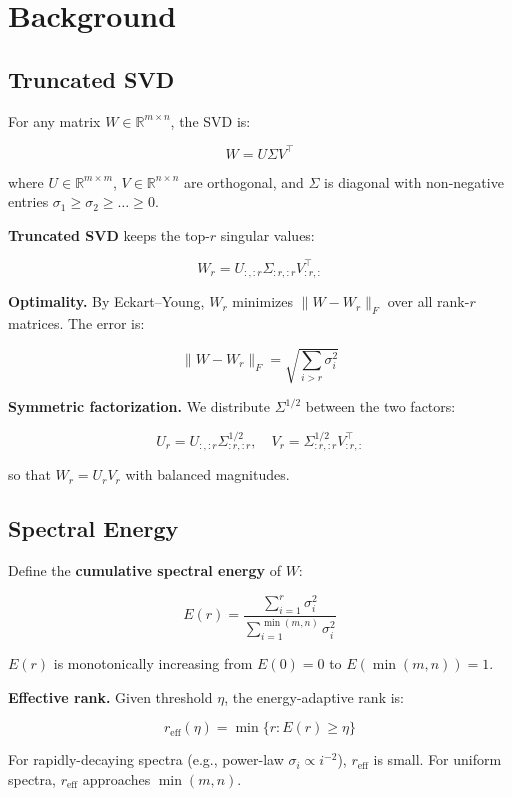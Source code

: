 
\section{Background}

\subsection{Truncated SVD}

For any matrix $W \in \mathbb{R}^{m \times n}$, the SVD is:

\[
W = U \Sigma V^\top
\tag{3.1}
\]

where $U \in \mathbb{R}^{m \times m}$, $V \in \mathbb{R}^{n \times n}$ are 
orthogonal, and $\Sigma$ is diagonal with non-negative entries 
$\sigma_1 \geq \sigma_2 \geq \dots \geq 0$.

\textbf{Truncated SVD} keeps the top-$r$ singular values:

\[
W_r = U_{:, :r} \Sigma_{:r, :r} V_{:r, :}^\top
\tag{3.2}
\]

\textbf{Optimality.} By Eckart--Young, $W_r$ minimizes $\|W - W_r\|_F$ over all 
rank-$r$ matrices. The error is:

\[
\|W - W_r\|_F = \sqrt{\sum_{i > r} \sigma_i^2}
\tag{3.3}
\]

\textbf{Symmetric factorization.} We distribute $\Sigma^{1/2}$ between the two 
factors:

\[
U_r = U_{:, :r} \Sigma_{:r, :r}^{1/2}, \quad
V_r = \Sigma_{:r, :r}^{1/2} V_{:r, :}^\top
\tag{3.4}
\]

so that $W_r = U_r V_r$ with balanced magnitudes.

\subsection{Spectral Energy}

Define the \textbf{cumulative spectral energy} of $W$:

\[
E(r) = \frac{\sum_{i=1}^{r} \sigma_i^2}{\sum_{i=1}^{\min(m, n)} \sigma_i^2}
\tag{3.5}
\]

$E(r)$ is monotonically increasing from $E(0) = 0$ to $E(\min(m, n)) = 1$.

\textbf{Effective rank.} Given threshold $\eta$, the energy-adaptive rank is:

\[
r_\text{eff}(\eta) = \min\{r : E(r) \geq \eta\}
\tag{3.6}
\]

For rapidly-decaying spectra (e.g., power-law $\sigma_i \propto i^{-2}$), 
$r_\text{eff}$ is small. For uniform spectra, $r_\text{eff}$ approaches 
$\min(m, n)$.

